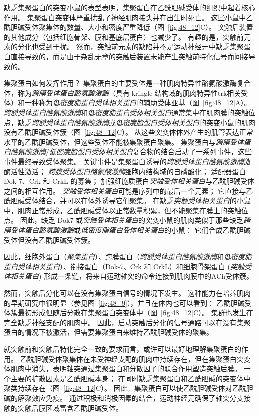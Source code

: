缺乏集聚蛋白的突变小鼠的表型表明，集聚蛋白在乙酰胆碱受体的组织中起着核心作用。
集聚蛋白突变体严重扰乱了神经肌肉接头并在出生时死亡。
这些小鼠中乙酰胆碱受体聚集体的数量、大小和密度严重降低（图~\ref{fig:48_12}C）。
突触后装置的其他成分（包括细胞骨架、膜和基底层蛋白）也减少了。
有趣的是，突触前元素的分化也受到干扰。
然而，突触前元素的缺陷并不是运动神经元中缺乏集聚蛋白直接导致的，而是由于杂乱无章的突触后装置未能产生突触前特化信号而间接导致的。


集聚蛋白如何发挥作用？
集聚蛋白的主要受体是一种肌肉特异性酪氨酸激酶复合体，称为\textit{跨膜受体蛋白酪氨酸激酶}（具有 kringle 结构域的肌肉特异性trk相关受体）和一种称为\textit{低密度脂蛋白受体相关蛋白}的辅助受体亚基（图~\ref{fig:48_12}A）。
\textit{跨膜受体蛋白酪氨酸激酶}和\textit{低密度脂蛋白受体相关蛋白}通常集中在肌肉膜的突触位点，缺乏\textit{跨膜受体蛋白酪氨酸激酶}或\textit{低密度脂蛋白受体相关蛋白}的突变小鼠的肌肉没有乙酰胆碱受体簇（图~\ref{fig:48_12}C）。
从这些突变体体外产生的肌管表达正常水平的乙酰胆碱受体，但这些受体不能被集聚蛋白聚集。
集聚蛋白与\textit{跨膜受体蛋白酪氨酸激酶}/\textit{低密度脂蛋白受体相关蛋白}复合物的结合启动了一系列事件，这些事件最终导致受体聚集。
关键事件是集聚蛋白诱导的\textit{跨膜受体蛋白酪氨酸激酶}激酶活性激活；
\textit{跨膜受体蛋白酪氨酸激酶}细胞内结构域的自磷酸化；
适配器蛋白 Dok-7、Crk 和 CrkL 的募集；
加强细胞质蛋白\textit{突触受体相关蛋白}与乙酰胆碱受体之间的相互作用。
\textit{突触受体相关蛋白}可能是序列中的最后一个元素；
它直接与乙酰胆碱受体结合，并可以在体外诱导它们聚集。
在缺乏\textit{突触受体相关蛋白}的小鼠中，肌肉正常形成，乙酰胆碱受体以正常数量积累，但不能聚集在膜上的突触位点。
因此，缺乏 Dok7 或\textit{突触受体相关蛋白}的突变小鼠的肌肉类似于那些缺乏\textit{跨膜受体蛋白酪氨酸激酶}或\textit{低密度脂蛋白受体相关蛋白}的小鼠：
它们合成乙酰胆碱受体但没有乙酰胆碱受体簇。


因此，细胞外蛋白（\textit{聚集蛋白}）、跨膜蛋白（\textit{跨膜受体蛋白酪氨酸激酶}和\textit{低密度脂蛋白受体相关蛋白}）、衔接蛋白（Dok-7、Crk 和 CrkL）和细胞骨架蛋白 (\textit{突触受体相关蛋白}) 形成一条链，将来自运动轴突的命令连接到肌肉膜中的ACh受体簇。


然而，突触后分化可以在没有集聚蛋白信号的情况下发生。
这种能力在培养肌肉的早期研究中很明显（参见图~\ref{fig:48_9}），并且在体内也可以看到：
乙酰胆碱受体簇最初形成但随后分散在集聚蛋白突变体中（图~\ref{fig:48_12}C）。
集群也发生在完全缺乏神经支配的肌肉中。
因此，启动突触后分化的信号通路可以在没有集聚蛋白的情况下被激活，但需要集聚蛋白来维持乙酰胆碱受体的聚集。


就突触前和突触后特化完全一致的要求而言，或许可以最好地理解集聚蛋白的作用。
乙酰胆碱受体聚集体在未受神经支配的肌肉中持续存在，但在集聚蛋白突变体肌肉中消失，表明轴突通过集聚蛋白和分散因子的联合作用塑造突触后膜。
一个主要的扩散因素是乙酰胆碱本身；
在同时缺乏集聚蛋白和乙酰胆碱的突变体中聚类持续存在（图~\ref{fig:48_12}C）。
因此，集聚蛋白可以使乙酰胆碱受体对乙酰胆碱的解聚效应免疫。
通过积极和消极因素的结合，运动神经元确保了轴突分支接触的突触后膜区域富含乙酰胆碱受体。



